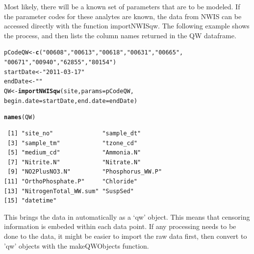 \documentclass[a4paper,11pt]{article}\usepackage[]{graphicx}\usepackage[]{color}
\makeatletter
\newcommand{\hlstr}[1]{\textcolor[rgb]{0.192,0.494,0.8}{#1}}%
\newcommand{\hlstd}[1]{\textcolor[rgb]{0.345,0.345,0.345}{#1}}%
\newcommand{\hlkwb}[1]{\textcolor[rgb]{0.69,0.353,0.396}{#1}}%
\newcommand{\hlkwc}[1]{\textcolor[rgb]{0.333,0.667,0.333}{#1}}%
\newcommand{\hlkwd}[1]{\textcolor[rgb]{0.737,0.353,0.396}{\textbf{#1}}}%
\newenvironment{kframe}{%
 \def\at@end@of@kframe{}%
 \ifinner\ifhmode%
  \def\at@end@of@kframe{\end{minipage}}%
  \begin{minipage}{\columnwidth}%
 \fi\fi%
 \def\FrameCommand##1{\hskip\@totalleftmargin \hskip-\fboxsep
 \colorbox{shadecolor}{##1}\hskip-\fboxsep
     \hskip-\linewidth \hskip-\@totalleftmargin \hskip\columnwidth}%
 \MakeFramed {\advance\hsize-\width
   \@totalleftmargin\z@ \linewidth\hsize
   \@setminipage}}%
 {\par\unskip\endMakeFramed%
 \at@end@of@kframe}
\newenvironment{knitrout}{}{} %
\makeatother
\begin{document}
Most likely, there will be a known set of parameters that are to be modeled. If the parameter codes for these analytes are known, the data from NWIS can be accessed directly with the function importNWISqw. The following example shows the process, and then lists the column names returned in the QW dataframe.


\begin{knitrout}
\color{fgcolor}\begin{kframe}
\begin{alltt}
\hlstd{pCodeQW} \hlkwb{<-} \hlkwd{c}\hlstd{(}\hlstr{"00608"}\hlstd{,}\hlstr{"00613"}\hlstd{,}\hlstr{"00618"}\hlstd{,}\hlstr{"00631"}\hlstd{,}\hlstr{"00665"}\hlstd{,}
             \hlstr{"00671"}\hlstd{,}\hlstr{"00940"}\hlstd{,}\hlstr{"62855"}\hlstd{,}\hlstr{"80154"}\hlstd{)}
\hlstd{startDate} \hlkwb{<-} \hlstr{"2011-03-17"}
\hlstd{endDate} \hlkwb{<-} \hlstr{""}
\hlstd{QW} \hlkwb{<-} \hlkwd{importNWISqw}\hlstd{(site,} \hlkwc{params}\hlstd{=pCodeQW,}
                   \hlkwc{begin.date}\hlstd{=startDate,} \hlkwc{end.date}\hlstd{=endDate)}
\end{alltt}
\end{kframe}
\end{knitrout}





\begin{knitrout}
\color{fgcolor}\begin{kframe}
\begin{alltt}
\hlkwd{names}\hlstd{(QW)}
\end{alltt}
\begin{verbatim}
 [1] "site_no"              "sample_dt"           
 [3] "sample_tm"            "tzone_cd"            
 [5] "medium_cd"            "Ammonia.N"           
 [7] "Nitrite.N"            "Nitrate.N"           
 [9] "NO2PlusNO3.N"         "Phosphorus_WW.P"     
[11] "OrthoPhosphate.P"     "Chloride"            
[13] "NitrogenTotal_WW.sum" "SuspSed"             
[15] "datetime"            
\end{verbatim}
\end{kframe}
\end{knitrout}



This brings the data in automatically as a `qw' object. This means that censoring information is embeded within each data point. If any processing needs to be done to the data, it might be easier to import the raw data first, then convert to 'qw' objects with the makeQWObjects function.
\end{document}
